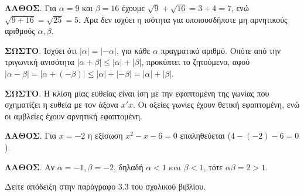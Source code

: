 
\begin{Alist}
\item
\begin{alist}
\item \textbf{ΛΑΘΟΣ}. Για $\alpha=9$ και $\beta=16$ έχουμε $\sqrt{9} + \sqrt{16} = 3 + 4 = 7$, ενώ $\sqrt{9 + 16} = \sqrt{25} = 5$. Άρα δεν ισχύει η ισότητα για οποιουσδήποτε μη αρνητικούς αριθμούς $\alpha,\beta$.
\item \textbf{ΣΩΣΤΟ}. Ισχύει ότι $|\alpha| = |-\alpha|$, για κάθε $\alpha$ πραγματικό αριθμό. Οπότε από την τριγωνική ανισότητα $|\alpha + \beta| \le |\alpha| + |\beta|$, προκύπτει το ζητούμενο, αφού $|\alpha-\beta|=|\alpha + (-\beta)| \le |\alpha| + |-\beta| = |\alpha| + |\beta|$. 
\item \textbf{ΣΩΣΤΟ}. Η κλίση μίας ευθείας είναι ίση με την εφαπτομένη της γωνίας που σχηματίζει η ευθεία με τον άξονα $x'x$. Οι οξείες γωνίες έχουν θετική εφαπτομένη, ενώ οι αμβλείες έχουν αρνητική εφαπτομένη.
\item \textbf{ΛΑΘΟΣ}. Για $x=-2$ η εξίσωση $x^2 - x - 6 = 0$ επαληθεύεται ($4 - (-2) - 6 = 0$).
\item \textbf{ΛΑΘΟΣ}. Αν $\alpha=-1, \beta=-2$, δηλαδή $\alpha < 1 \text{ και } \beta < 1$, τότε $\alpha\beta=2>1$.
\end{alist}

\item Δείτε απόδειξη στην παράγραφο 3.3 του σχολικού βιβλίου.



\end{Alist}

